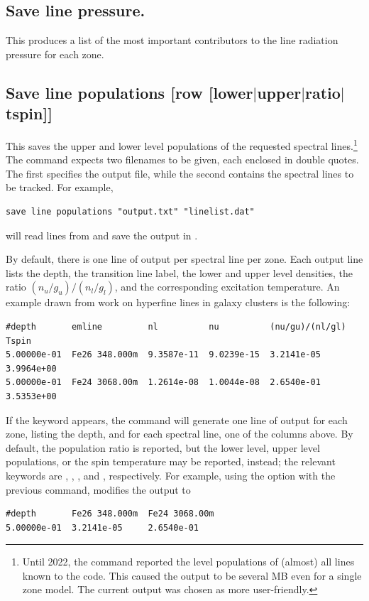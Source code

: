 \subsection{Save line pressure.}

This produces a list of the most important contributors to the line
radiation pressure for each zone.

\subsection{Save line populations
        [row [lower$\vert$upper$\vert$ratio$\vert$tspin]]}
\label{sec:CommandSaveHyperfinePops}

This saves the upper and lower level populations of the requested spectral
lines.\footnote{
Until 2022, the command reported the level populations of (almost) all lines
known to the code.
This caused the output to be several MB even for a single zone model.
The current output was chosen as more user-friendly.
}
The command expects two filenames to be given, each enclosed in double quotes.
The first specifies the output file, while the second contains the spectral
lines to be tracked.
For example,
%
\begin{verbatim}
save line populations "output.txt" "linelist.dat"
\end{verbatim}
%
will read lines from  and save the output in
.

By default, there is one line of output per spectral line per zone.
Each output line lists the depth, the transition line label,
the lower and upper level densities, the ratio $(n_u/g_u)/(n_l/g_l)$,
and the corresponding excitation temperature.
An example drawn from work on hyperfine lines in galaxy clusters is the
following:
%
\begin{verbatim}
#depth       emline         nl          nu          (nu/gu)/(nl/gl)  Tspin
5.00000e-01  Fe26 348.000m  9.3587e-11  9.0239e-15  3.2141e-05       3.9964e+00
5.00000e-01  Fe24 3068.00m  1.2614e-08  1.0044e-08  2.6540e-01       3.5353e+00
\end{verbatim}

If the  keyword appears, the command will generate one line of
output for each zone, listing the depth, and for each spectral line, one of the
columns above.
By default, the population ratio is reported, but the lower level, upper level
populations, or the spin temperature may be reported, instead; the relevant
keywords are , , , and
, respectively.
For example, using the  option with the previous command,
modifies the output to
%
\begin{verbatim}
#depth       Fe26 348.000m  Fe24 3068.00m
5.00000e-01  3.2141e-05     2.6540e-01
\end{verbatim}

